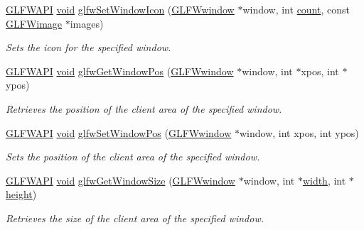 \begin{DoxyCompactItemize}
\mbox{\hyperlink{glfw3_8h_a56da5036b2cc259351ae22fd6439bb47}{G\+L\+F\+W\+A\+PI}} \mbox{\hyperlink{glad_8h_a950fc91edb4504f62f1c577bf4727c29}{void}} \mbox{\hyperlink{group__window_ga182987a1a62a41a924842b9473d560df}{glfw\+Set\+Window\+Icon}} (\mbox{\hyperlink{group__window_ga3c96d80d363e67d13a41b5d1821f3242}{G\+L\+F\+Wwindow}} $\ast$window, int \mbox{\hyperlink{glad_8h_a83e2dd3e98558b907ab7fb03cee26bda}{count}}, const \mbox{\hyperlink{struct_g_l_f_wimage}{G\+L\+F\+Wimage}} $\ast$images)
\begin{DoxyCompactList}\small\item\em Sets the icon for the specified window. \end{DoxyCompactList}\item 
\mbox{\hyperlink{glfw3_8h_a56da5036b2cc259351ae22fd6439bb47}{G\+L\+F\+W\+A\+PI}} \mbox{\hyperlink{glad_8h_a950fc91edb4504f62f1c577bf4727c29}{void}} \mbox{\hyperlink{group__window_ga0076a8591ef7494d359730cf2250b45b}{glfw\+Get\+Window\+Pos}} (\mbox{\hyperlink{group__window_ga3c96d80d363e67d13a41b5d1821f3242}{G\+L\+F\+Wwindow}} $\ast$window, int $\ast$xpos, int $\ast$ypos)
\begin{DoxyCompactList}\small\item\em Retrieves the position of the client area of the specified window. \end{DoxyCompactList}\item 
\mbox{\hyperlink{glfw3_8h_a56da5036b2cc259351ae22fd6439bb47}{G\+L\+F\+W\+A\+PI}} \mbox{\hyperlink{glad_8h_a950fc91edb4504f62f1c577bf4727c29}{void}} \mbox{\hyperlink{group__window_ga0dc8d880a0d87be16d3ea8114561f6f0}{glfw\+Set\+Window\+Pos}} (\mbox{\hyperlink{group__window_ga3c96d80d363e67d13a41b5d1821f3242}{G\+L\+F\+Wwindow}} $\ast$window, int xpos, int ypos)
\begin{DoxyCompactList}\small\item\em Sets the position of the client area of the specified window. \end{DoxyCompactList}\item 
\mbox{\hyperlink{glfw3_8h_a56da5036b2cc259351ae22fd6439bb47}{G\+L\+F\+W\+A\+PI}} \mbox{\hyperlink{glad_8h_a950fc91edb4504f62f1c577bf4727c29}{void}} \mbox{\hyperlink{group__window_ga7feb769ebb3f3d21579b5a3fb07be76e}{glfw\+Get\+Window\+Size}} (\mbox{\hyperlink{group__window_ga3c96d80d363e67d13a41b5d1821f3242}{G\+L\+F\+Wwindow}} $\ast$window, int $\ast$\mbox{\hyperlink{glad_8h_a09012ea95ebbbe1c032db7c68b54291e}{width}}, int $\ast$\mbox{\hyperlink{glad_8h_a456943498a720df0f4b62bafa5dad93c}{height}})
\begin{DoxyCompactList}\small\item\em Retrieves the size of the client area of the specified window. \end{DoxyCompactList}\item 

\end{DoxyCompactItemize}
